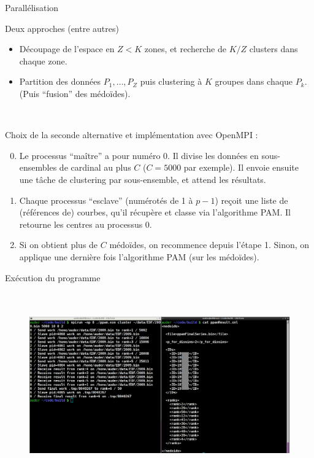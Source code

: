 \begin{frame}{Parallélisation}

\begin{block}{Deux approches (entre autres)}
\begin{itemize}
\item Découpage de l'espace en $Z < K$ zones, et recherche de $K/Z$ clusters dans chaque zone.
\item Partition des données $P_1,\dots,P_Z$ puis clustering à $K$ groupes dans chaque $P_k$. 
(Puis ``fusion'' des médoïdes).
\end{itemize}
\end{block}

~\\[-0.1cm]
{\footnotesize
Choix de la seconde alternative et implémentation avec OpenMPI :
\begin{enumerate}
\setcounter{enumi}{-1}
\item Le processus ``maître'' a pour numéro 0. Il divise les données en sous-ensembles de cardinal au plus 
$C$ ($C = 5000$ par exemple). Il envoie ensuite une tâche de clustering par sous-ensemble, et attend les résultats.
\item Chaque processus ``esclave'' (numérotés de 1 à $p-1$) reçoit une liste de (références de) courbes, qu'il récupère 
et classe via l'algorithme PAM. Il retourne les centres au processus 0.
\item Si on obtient plus de $C$ médoïdes, on recommence depuis l'étape 1. Sinon, on applique une dernière 
fois l'algorithme PAM (sur les médoïdes).
\end{enumerate}
}

\end{frame}

\begin{frame}{Exécution du programme}

\vspace*{-0.5cm}
\begin{figure}
\includegraphics[width=\linewidth,height=8cm]{pics/screen_demo.png}
\end{figure}

\end{frame}

